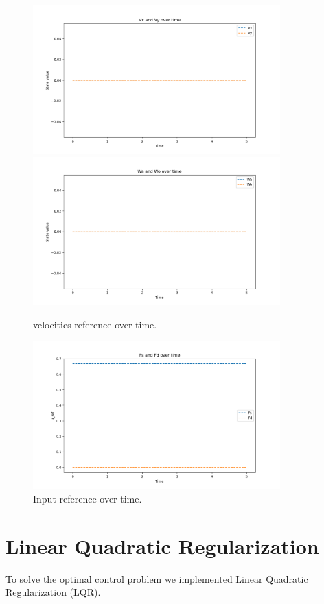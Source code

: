 \begin{figure}[H]
  \centering
  \includegraphics[width=0.85\textwidth]{pictures/Vx_vyreef.png}\hfill \\
  \includegraphics[width=0.85\textwidth]{pictures/wa wo ref.png}\hfill
  \caption{velocities reference over time.}
  \label{fig:Reference trajectory}
  \includegraphics[width=0.85\textwidth]{pictures/Fs fd ref.png}
  \caption{Input reference over time.}
  \label{fig:Reference trajectory}
\end{figure}


\section{Linear Quadratic Regularization}
To solve the optimal control problem we implemented Linear Quadratic Regularization (LQR).
